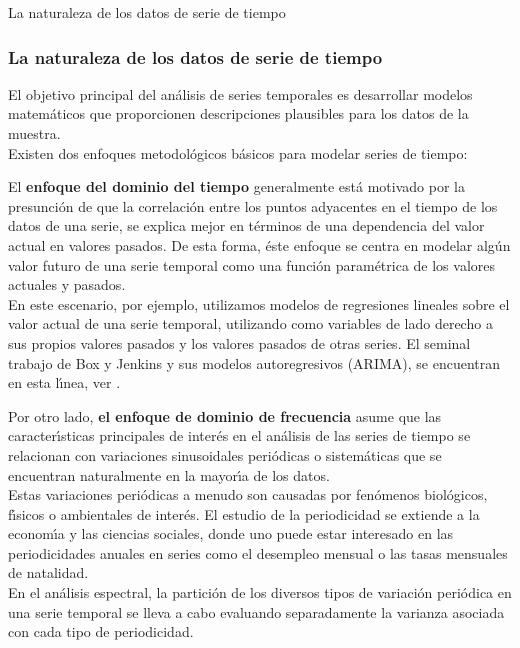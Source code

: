 \documentclass[xcolor=(list of options)]{beamer}
\begin{document}
\begin{section}{La naturaleza de los datos de serie de tiempo}
\begin{frame}
\frametitle{La naturaleza de los datos de serie de tiempo}

El objetivo principal del an\'alisis de series temporales es desarrollar modelos matem\'aticos que proporcionen descripciones plausibles para los datos de la muestra.
\\
Existen dos enfoques metodol\'ogicos b\'asicos para modelar series de tiempo:
 
\end{frame}
\begin{frame}

El \textbf{enfoque del dominio del tiempo} generalmente est\'a motivado por la presunci\'on de que la correlaci\'on entre los puntos adyacentes en el tiempo de los datos de una serie, se explica mejor en t\'erminos de una dependencia del valor actual en valores pasados. De esta forma, \'este enfoque se centra en modelar alg\'un valor futuro de una serie temporal como una función param\'etrica de los valores actuales y pasados.
\\
En este escenario, por ejemplo, utilizamos modelos de regresiones lineales sobre el valor actual de una serie temporal, utilizando como variables de lado derecho a sus propios valores pasados y los valores pasados de otras series. El seminal trabajo de Box y Jenkins y sus modelos autoregresivos (ARIMA), se encuentran en esta l\'\i{}nea, ver \cite{BoxJenkins}.

\end{frame}
\begin{frame}

Por otro lado, \textbf{el enfoque de dominio de frecuencia} asume que las caracter\'\i{}sticas principales de inter\'es en el an\'alisis de las series de tiempo se relacionan con variaciones sinusoidales peri\'odicas o sistem\'aticas que se encuentran naturalmente en la mayor\'\i{}a de los datos.
\\
Estas variaciones peri\'odicas a menudo son causadas por fen\'omenos biol\'ogicos, f\'\i{}sicos o ambientales de inter\'es. El estudio de la periodicidad se extiende a la econom\'\i{}a y las ciencias sociales, donde uno puede estar interesado en las periodicidades anuales en series como el desempleo mensual o las tasas mensuales de natalidad.
\\
En el an\'alisis espectral, la partici\'on de los diversos tipos de variaci\'on peri\'odica en una serie temporal se lleva a cabo evaluando separadamente la varianza asociada con cada tipo de periodicidad.


\end{frame}
\end{section}
\end{document}
